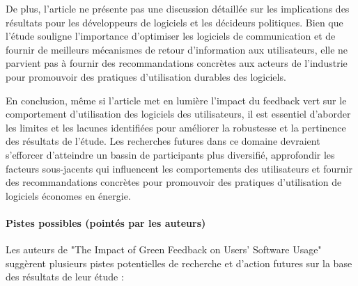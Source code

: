 De plus, l’article ne présente pas une discussion détaillée sur les implications des résultats pour les développeurs de logiciels et les décideurs politiques. Bien que l'étude souligne l'importance d'optimiser les logiciels de communication et de fournir de meilleurs mécanismes de retour d'information aux utilisateurs, elle ne parvient pas à fournir des recommandations concrètes aux acteurs de l'industrie pour promouvoir des pratiques d'utilisation durables des logiciels.

En conclusion, même si l'article met en lumière l'impact du feedback vert sur le comportement d'utilisation des logiciels des utilisateurs, il est essentiel d'aborder les limites et les lacunes identifiées pour améliorer la robustesse et la pertinence des résultats de l'étude. Les recherches futures dans ce domaine devraient s'efforcer d'atteindre un bassin de participants plus diversifié, approfondir les facteurs sous-jacents qui influencent les comportements des utilisateurs et fournir des recommandations concrètes pour promouvoir des pratiques d'utilisation de logiciels économes en énergie.

\paragraph{Pistes possibles (pointés par les auteurs)}
Les auteurs de "The Impact of Green Feedback on Users' Software Usage" suggèrent plusieurs pistes potentielles de recherche et d'action futures sur la base des résultats de leur étude :

